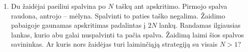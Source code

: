 \begin{enumerate}
  \item {} Du žaidėjai paeiliui spalvina po
    $N$ taškų ant apskritimo. Pirmojo spalva raudona, antrojo – mėlyna.
    Spalvinti to paties taško negalima. Žaidimo pabaigoje gaunamas
    apskritimas padalintas į $2N$ lankų. Randamas ilgiausias lankas, kurio
    abu galai nuspalvinti ta pačia spalva. Žaidimą laimi šios spalvos
    savininkas. Ar kuris nors žaidėjas turi laiminčiąją strategiją su visais
    $N>1$? 


\end{enumerate}
